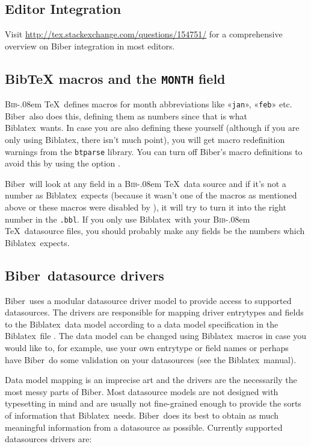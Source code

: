 \documentclass{ltxdockit}
\def\BibTeX{\textsc{Bib}\kern-.08em \TeX}
\newcommand*{\biber}{Biber\xspace}
\newcommand*{\biblatex}{Biblatex\xspace}
\begin{document}
\bigskip
\subsection{Editor Integration}

Visit \url{http://tex.stackexchange.com/questions/154751/} for a
comprehensive overview on \biber integration in most editors.

\subsection{BibTeX macros and the \texttt{MONTH} field}

\BibTeX\ defines macros for month abbreviations
like «\verb+jan+», «\verb+feb+» etc. \biber\ also does this,
defining them as numbers since that is what \biblatex\ wants. In
case you are also defining these yourself (although if you are only
using \biblatex, there isn't much point), you will get macro
redefinition warnings from the \verb+btparse+ library. You can turn
off \biber's macro definitions to avoid this by using the option
.

\biber\ will look at any  field in a \BibTeX\ data
source and if it's not a number as \biblatex\ expects (because it
wasn't one of the macros as mentioned above or these macros were disabled
by ), it will try to turn it into the right number in
the \verb+.bbl+. If you only use \biblatex\ with your \BibTeX\
datasource files, you should probably make any  fields be the
numbers which \biblatex\ expects.

\subsection{\biber\ datasource drivers}\label{dsd}

\biber\ uses a modular datasource driver model to provide access
to supported datasources. The drivers are responsible for mapping
driver entrytypes and fields to the \biblatex\ data model according to a
data model specification in the \biblatex\ file \file{blx-dm.def}. The
data model can be changed using \biblatex\ macros in case you would
like to, for example, use your own entrytype or field names or perhaps
have \biber\ do some validation on your datasources (see the \biblatex\
manual). 

Data model mapping is an imprecise art and the drivers are the
necessarily the most messy parts of \biber. Most datasource models are
not designed with typesetting in mind and are usually not fine-grained
enough to provide the sorts of information that \biblatex\
needs. \biber\ does its best to obtain as much meaningful information
from a datasource as possible. Currently supported datasources
drivers are:
\end{document}
